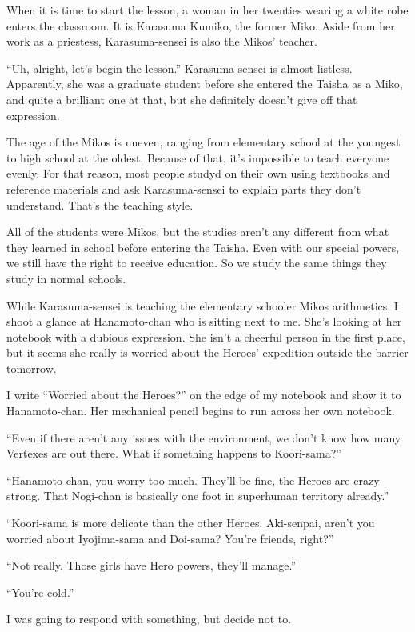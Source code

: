 When it is time to start the lesson, a woman in her twenties wearing a white robe enters the classroom. It is Karasuma Kumiko, the former Miko. Aside from her work as a priestess, Karasuma-sensei is also the Mikos' teacher.

``Uh, alright, let's begin the lesson.''  Karasuma-sensei is almost listless. Apparently, she was a graduate student before she entered the Taisha as a Miko, and quite a brilliant one at that, but she definitely doesn't give off that expression.

The age of the Mikos is uneven, ranging from elementary school at the youngest to high school at the oldest. Because of that, it's impossible to teach everyone evenly. For that reason, most people studyd on their own using textbooks and reference materials and ask Karasuma-sensei to explain parts they don't understand. That's the teaching style.

All of the students were Mikos, but the studies aren't any different from what they learned in school before entering the Taisha. Even with our special powers, we still have the right to receive education. So we study the same things they study in normal schools.

While Karasuma-sensei is teaching the elementary schooler Mikos arithmetics, I shoot a glance at Hanamoto-chan who is sitting next to me. She's looking at her notebook with a dubious expression. She isn't a cheerful person in the first place, but it seems she really is worried about the Heroes' expedition outside the barrier tomorrow.

I write ``Worried about the Heroes?'' on the edge of my notebook and show it to Hanamoto-chan. Her mechanical pencil begins to run across her own notebook.

``Even if there aren't any issues with the environment, we don't know how many Vertexes are out there. What if something happens to Koori-sama?''

``Hanamoto-chan, you worry too much. They'll be fine, the Heroes are crazy strong. That Nogi-chan is basically one foot in superhuman territory already.''

``Koori-sama is more delicate than the other Heroes. Aki-senpai, aren't you worried about Iyojima-sama and Doi-sama? You're friends, right?''

``Not really. Those girls have Hero powers, they'll manage.''

``You're cold.''

I was going to respond with something, but decide not to.

